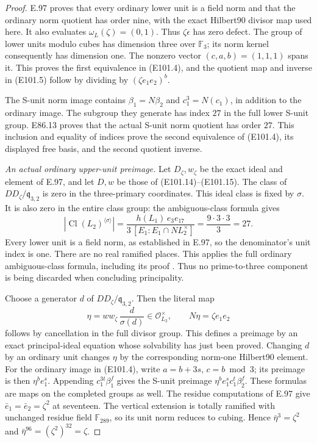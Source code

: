 \begin{proof}
E.97 proves that every ordinary lower unit is a field
norm and that the ordinary norm quotient has order nine,
with the exact Hilbert90 divisor map used here.
It also evaluates \(\omega_L(\zeta)=(0,1)\).
Thus \(\zeta\epsilon\) has zero defect.
The group of lower units modulo cubes has dimension three
over \(\mathbb F_3\); its norm kernel consequently has
dimension one. The nonzero vector \((c,a,b)=(1,1,1)\)
spans it. This proves the first equivalence in (E101.4),
and the quotient map and inverse in (E101.5) follow by
dividing by \((\zeta e_1e_2)^b\).

The S-unit norm image contains \(\beta_1=N\beta_2\)
and \(c_1^3=N(c_1)\), in addition to the ordinary
image. The subgroup they generate has index \(27\)
in the full lower S-unit group. E86.13 proves that
the actual S-unit norm quotient has order \(27\).
This inclusion and equality of indices prove the
second equivalence of (E101.4), its displayed free
basis, and the second quotient inverse.

\emph{An actual ordinary upper-unit preimage.}
Let \(D_\zeta,w_\zeta\) be the exact ideal and element
of E.97, and let \(D,w\) be those of (E101.14)--(E101.15).
The class of \(DD_\zeta/\mathfrak q_{3,2}\) is zero
in the three-primary coordinates. This ideal class
is fixed by \(\sigma\). It is also zero in the entire
class group: the ambiguous-class formula gives
\[
 \left|\operatorname{Cl}(L_2)^{\langle\sigma\rangle}\right|
    =\frac{h(L_1)\,e_3e_{17}}
       {3\,[E_1:E_1\cap NL_2^\times]}
    =\frac{9\cdot3\cdot3}{3}=27.
 \tag{E101.18}
\]
Every lower unit is a field norm, as established in E.97,
so the denominator's unit index is one. There are no
real ramified places. This applies the full ordinary
ambiguous-class formula, including its proof
\cite[Theorem1]{E_LemmermeyerAmbiguous}.
Thus no prime-to-three component is being discarded
when concluding principality.

Choose a generator \(d\) of
\(DD_\zeta/\mathfrak q_{3,2}\). Then the literal map
\[
        \eta=ww_\zeta\,\frac d{\sigma(d)}
        \in\mathcal O_{L_2}^{\times},\qquad
        N\eta=\zeta e_1e_2
 \tag{E101.19}
\]
follows by cancellation in the full divisor group.
This defines a preimage by an exact principal-ideal
equation whose solvability has just been proved.
Changing \(d\) by an ordinary unit changes \(\eta\)
by the corresponding norm-one Hilbert90 element.
For the ordinary image in (E101.4), write
\(a=b+3s\), \(c=b\bmod3\); its preimage is then
\(\eta^b e_1^s\). Appending \(c_1^{3t}\beta_1^f\)
gives the S-unit preimage \(\eta^b e_1^s c_1^t\beta_2^f\).
These formulas are maps on the completed groups as well.
The residue computations of E.97 give
\(\bar e_1=\bar e_2=\zeta^2\) at seventeen.
The vertical extension is totally ramified with
unchanged residue field \(\mathbb F_{289}\), so its
unit norm reduces to cubing. Hence
\(\bar\eta^3=\zeta^2\) and
\(\bar\eta^{96}=(\zeta^2)^{32}=\zeta\).


\end{proof}
